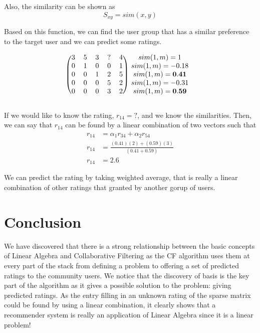 \documentclass[paper=a4, fontsize=12pt]{scrartcl} %
\numberwithin{equation}{section} %
\numberwithin{figure}{section} %
\numberwithin{table}{section} %
\begin{document}
  Also, the similarity can be shown as
  \[
    S_{xy} = sim(x,y)
  \]

  Based on this function, we can find the user group that has a similar
  preference to the target user and we can predict some ratings.

  \[
    \begin{blockarray}{cccccc}
      \begin{block}{(ccccc)c}
        3 & 5 & 3 & \mathbf{?} & 4 & sim(1,m) = 1 \\
        0 & 1 & 0 & 0 & 1 & sim(1,m) = -0.18 \\
        0 & 0 & 1 & 2 & 5 & sim(1,m) = \mathbf{0.41} \\
        0 & 0 & 0 & 5 & 2 & sim(1,m) = -0.31 \\
        0 & 0 & 0 & 3 & 2 & sim(1,m) = \mathbf{0.59} \\
      \end{block}
    \end{blockarray}
  \]

  If we would like to know the rating, \(r_{14} = ?\), and we know the
  similarities. Then, we can say that \(r_{14}\) can be found by a linear
  combination of two vectors such that
  \[
    \begin{split}
      r_{14} & = \alpha_1 r_{34} + \alpha_2 r_{54} \\
      r_{14} & = \frac{(0.41)(2) + (0.59)(3)}{(0.41 + 0.59)} \\
      r_{14} & = 2.6
    \end{split}
  \]

  We can predict the rating by taking weighted average, that is really a linear
  combination of other ratings that granted by another gorup of users.


  \section{Conclusion}

  We have discovered that there is a strong relationship between the basic
  concepts of Linear Algebra and Collaborative Filtering as the CF algorithm uses
  them at every part of the stack from defining a problem to offering a set of
  predicted ratings to the community users. We notice that the discovery of
  basis is the key part of the algorithm as it gives a possible solution to the
  problem: giving predicted ratings. As the entry filling in an unknown rating
  of the sparse matrix could be found by using a linear combination, it clearly
  shows that a recommender system is really an application of Linear Algebra since
  it is a linear problem!
\end{document}
